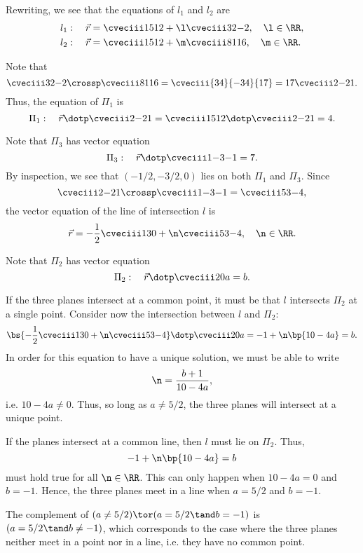 \begin{solution}
    Rewriting, we see that the equations of $l_1$ and $l_2$ are
    \begin{align*}
        l_1: \quad \vec r &= \cveciii1{5}{12} + \l \cveciii32{-2}, \quad \l \in \RR,\\
        l_2: \quad \vec r &= \cveciii15{12} + \m \cveciii8{11}6, \quad \m \in \RR.
    \end{align*}

    \begin{ppart}
        Note that \[\cveciii32{-2} \crossp \cveciii8{11}6 = \cveciii{34}{-34}{17} = 17\cveciii2{-2}1.\] Thus, the equation of $\Pi_1$ is \[\Pi_1: \quad \vec r \dotp \cveciii2{-2}1 = \cveciii15{12} \dotp \cveciii2{-2}1 = 4.\]
    \end{ppart}
    \begin{ppart}
        Note that $\Pi_3$ has vector equation \[\Pi_3: \quad \vec r \dotp \cveciii1{-3}{-1} = 7.\] By inspection, we see that $(-1/2, -3/2, 0)$ lies on both $\Pi_1$ and $\Pi_3$. Since \[\cveciii2{-2}1 \crossp \cveciii1{-3}{-1} = \cveciii5{3}{-4},\] the vector equation of the line of intersection $l$ is \[\vec r = -\frac12 \cveciii130 + \n \cveciii53{-4}, \quad \n \in \RR.\]
    \end{ppart}
    \begin{ppart}
        Note that $\Pi_2$ has vector equation \[\Pi_2: \quad \vec r \dotp \cveciii20a = b.\]

        \begin{psubpart}
            If the three planes intersect at a common point, it must be that $l$ intersects $\Pi_2$ at a single point. Consider now the intersection between $l$ and $\Pi_2$: \[\bs{-\frac12 \cveciii130 + \n \cveciii53{-4}} \dotp \cveciii20a = -1 + \n\bp{10 - 4a} = b.\] In order for this equation to have a unique solution, we must be able to write \[\n = \frac{b+1}{10-4a},\] i.e. $10 - 4a \neq 0$. Thus, so long as $a \neq 5/2$, the three planes will intersect at a unique point.
        \end{psubpart}
        \begin{psubpart}
            If the planes intersect at a common line, then $l$ must lie on $\Pi_2$. Thus, \[-1 + \n \bp{10-4a} = b\] must hold true for all $\n \in \RR$. This can only happen when $10 - 4a = 0$ and $b = -1$. Hence, the three planes meet in a line when $a = 5/2$ and $b = -1$.
        \end{psubpart}
        \begin{psubpart}
            The complement of $(a \neq 5/2) \tor (a = 5/2 \tand b = -1)$ is $(a = 5/2 \tand b \neq -1)$, which corresponds to the case where the three planes neither meet in a point nor in a line, i.e. they have no common point.
        \end{psubpart}
    \end{ppart}
\end{solution}

